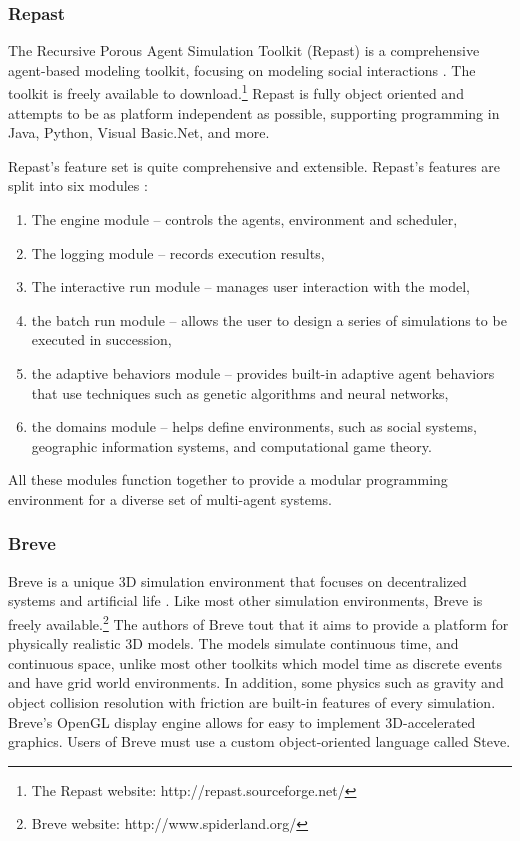 \subsubsection{Repast}
The Recursive Porous Agent Simulation Toolkit (Repast) is a comprehensive agent-based modeling toolkit, focusing on modeling social interactions \cite{collier2003ref}.
The toolkit is freely available to download.\footnote{The Repast website: http://repast.sourceforge.net/}
Repast is fully object oriented and attempts to be as platform independent as possible, supporting programming in Java, Python, Visual Basic.Net, and more.

Repast's feature set is quite comprehensive and extensible. Repast's features are split into six modules \cite{north2006experiences}:
\begin{enumerate}
   \item The engine module -- controls the agents, environment and scheduler,
   \item The logging module -- records execution results,
   \item The interactive run module -- manages user interaction with the model,
   \item the batch run module -- allows the user to design a series of simulations to be executed in succession,
   \item the adaptive behaviors module -- provides built-in adaptive agent behaviors that use techniques such as genetic algorithms and neural networks,
   \item the domains module -- helps define environments, such as social systems, geographic information systems, and computational game theory.
\end{enumerate}
All these modules function together to provide a modular programming environment for a diverse set of multi-agent systems.
   
\subsubsection{Breve}
Breve is a unique 3D simulation environment that focuses on decentralized systems and artificial life \cite{kleinbreve}.
Like most other simulation environments, Breve is freely available.\footnote{Breve website:  http://www.spiderland.org/}
The authors of Breve tout that it aims to provide a platform for physically realistic 3D models.
The models simulate continuous time, and continuous space, unlike most other toolkits which model time as discrete events and have grid world environments.
In addition, some physics such as gravity and object collision resolution with friction are built-in features of every simulation.
Breve's OpenGL display engine allows for easy to implement 3D-accelerated graphics.
Users of Breve must use a custom object-oriented language called Steve.


